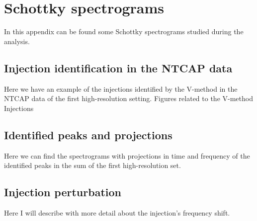 
\chapter{Schottky spectrograms}
In this appendix can be found some Schottky spectrograms studied during the analysis.
\section{Injection identification in the NTCAP data}
Here we have an example of the injections identified by the V-method in the NTCAP data of the first high-resolution setting.
Figures related to the V-method
Injections
\section{Identified peaks and projections}
Here we can find the spectrograms with projections in time and frequency of the identified peaks in the sum of the first high-resolution set.

\section{Injection perturbation}
Here I will describe with more detail about the injection's frequency shift.

